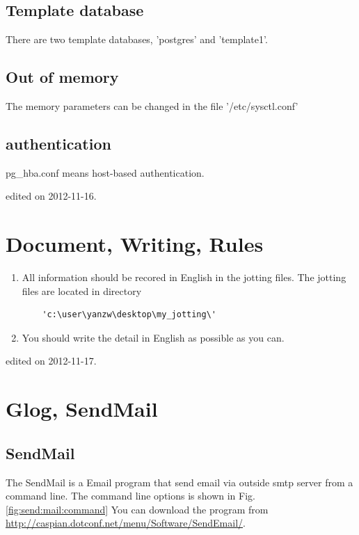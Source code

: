 \subsection{Template database}
There are two template databases, 'postgres' and 'template1'.

\subsection{Out of memory}
The memory parameters can be changed in the file '/etc/sysctl.conf'

\subsection{authentication}
pg\_hba.conf means host-based authentication.

\hfill {\tiny  edited on 2012-11-16.}


\section{Document, Writing, Rules}
\begin{enumerate}[(1)]
    \item All information should be recored in English in the jotting files.
    The jotting files are located in directory 
    \begin{verbatim}
    'c:\user\yanzw\desktop\my_jotting\'
    \end{verbatim}
    \item You should write the detail in English as possible as you can.
\end{enumerate}
\hfill {\tiny  edited on 2012-11-17.}


\section{Glog, SendMail}
\subsection{SendMail}
The SendMail is a Email program that send email via outside smtp server from a command line.
The command line options is shown in Fig. \ref{fig:send:mail:command}
You can download the program from 
\url{http://caspian.dotconf.net/menu/Software/SendEmail/}.

